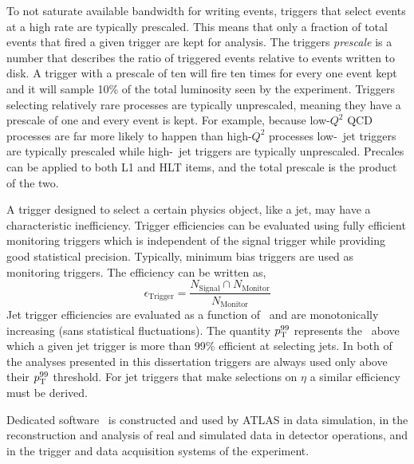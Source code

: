 To not saturate available bandwidth for writing events, triggers that select events at a high rate are typically prescaled.
This means that only a fraction of total events that fired a given trigger are kept for analysis.
The triggers \textit{prescale} is a number that describes the ratio of triggered events relative to events written to disk.
A trigger with a prescale of ten will fire ten times for every one event kept and it will sample 10\% of the total luminosity seen by the experiment.
Triggers selecting relatively rare processes are typically unprescaled, meaning they have a prescale of one and every event is kept.
For example, because low-$Q^2$ QCD processes are far more likely to happen than high-$Q^2$ processes low-\PT\ jet triggers are typically prescaled while high-\PT\ jet triggers are typically unprescaled.
Precales can be applied to both L1 and HLT items, and the total prescale is the product of the two.

A trigger designed to select a certain physics object, like a jet, may have a characteristic inefficiency.
Trigger efficiencies can be evaluated using fully efficient monitoring triggers which is independent of the signal trigger while providing good statistical precision.
Typically, minimum bias triggers are used as monitoring triggers.
The efficiency can be written as,
\begin{equation}
    \label{eq:trigeff}
    \epsilon_{\mathrm{Trigger}} = \frac{N_{\mathrm{Signal}}\cap N_{\mathrm{Monitor}}}{N_{\mathrm{Monitor}}}
\end{equation}
Jet trigger efficiencies are evaluated as a function of \PT\ and are monotonically increasing (sans statistical fluctuations).
The quantity $p_{\text{T}}^{99}$ represents the \PT\ above which a given jet trigger is more than 99\% efficient at selecting jets.
In both of the analyses presented in this dissertation triggers are always used only above their $p_{\text{T}}^{99}$ threshold.
For jet triggers that make selections on $\eta$ a similar efficiency must be derived.

Dedicated software~\cite{SOFT-2022-02} is constructed and used by ATLAS in data simulation, in the reconstruction
and analysis of real and simulated data in detector operations, and in the trigger and data acquisition
systems of the experiment.
